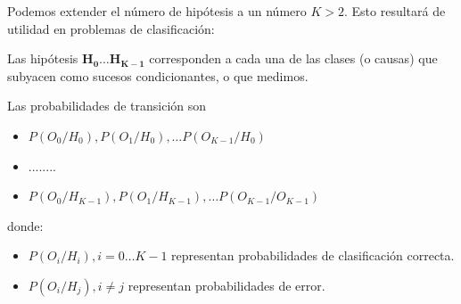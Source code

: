 \documentclass[11pt]{article}
\begin{document}
    Podemos extender el número de hipótesis a un número \(K>2\). Esto
resultará de utilidad en problemas de clasificación:

Las hipótesis \(\mathbf{H_0} \ldots \mathbf{H_{K-1}}\) corresponden a
cada una de las clases (o causas) que subyacen como sucesos
condicionantes, o que medimos.

Las probabilidades de transición son
\begin{itemize}
\item
\(P(O_0/H_0), P(O_1/H_0),\ldots P(O_{K-1}/H_0)\) 
\item  ........ 
\item
\(P(O_0/H_{K-1}), P(O_1/H_{K-1}),\ldots P(O_{K-1}/O_{K-1})\)
\end{itemize}

donde: 
\begin{itemize}
\item \(P(O_i/H_i), i=0\ldots K-1\) representan probabilidades de
clasificación correcta. 
\item \(P(O_i/H_j), i\neq j\) representan
probabilidades de error.
\end{itemize}

    
    
    
    
\end{document}
